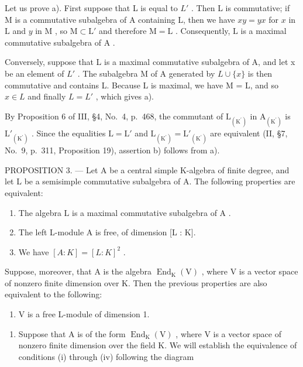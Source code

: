 Let us prove a). First suppose that L is equal to \(L'\) . Then L is commutative; if M is a commutative subalgebra of A containing L, then we have \(xy = yx\) for \(x\) in \(\mathrm{L}\) and \(y\) in \(\mathrm{M}\) , so \(\mathrm{M} \subset \mathrm{L}'\) and therefore \(\mathrm{M} = \mathrm{L}\) . Consequently, \(\mathrm{L}\) is a maximal commutative subalgebra of \(\mathrm{A}\) .

Conversely, suppose that L is a maximal commutative subalgebra of A, and let x be an element of \(L'\) . The subalgebra M of A generated by \(L \cup \{x\}\) is then commutative and contains L. Because L is maximal, we have M = L, and so \(x \in L\) and finally \(L = L'\) , which gives a).

By Proposition 6 of III, §4, No.~4, p.~468, the commutant of \(\mathrm{L}_{(\mathrm{K}^{\prime})}\) in \(\mathrm{A}_{(\mathrm{K}^{\prime})}\) is \(\mathrm{L}'_{(\mathrm{K}^{\prime})}\) . Since the equalities \(\mathrm{L} = \mathrm{L}'\) and \(\mathrm{L}_{(\mathrm{K}^{\prime})} = \mathrm{L}'_{(\mathrm{K}^{\prime})}\) are equivalent (II, §7, No.~9, p.~311, Proposition 19), assertion b) follows from a).

PROPOSITION 3. --- Let A be a central simple K-algebra of finite degree, and let L be a semisimple commutative subalgebra of A. The following properties are equivalent:

\begin{enumerate}
\def\labelenumi{(\roman{enumi})}
\item
  The algebra \(\mathrm{L}\) is a maximal commutative subalgebra of \(\mathrm{A}\) .
\item
  The left L-module A is free, of dimension {[}L : K{]}.
\item
  We have \([A:K]=[L:K]^{2}\) .
\end{enumerate}

Suppose, moreover, that A is the algebra \(\operatorname{End}_{\mathrm{K}}(\mathrm{V})\) , where V is a vector space of nonzero finite dimension over K. Then the previous properties are also equivalent to the following:

\begin{enumerate}
\def\labelenumi{(\roman{enumi})}
\setcounter{enumi}{3}
\tightlist
\item
  V is a free L-module of dimension 1.
\end{enumerate}

\begin{enumerate}
\def\labelenumi{\Alph{enumi})}
\tightlist
\item
  Suppose that A is of the form \(\operatorname{End}_{\mathrm{K}}(\mathrm{V})\) , where V is a vector space of nonzero finite dimension over the field K. We will establish the equivalence of conditions (i) through (iv) following the diagram
\end{enumerate}

